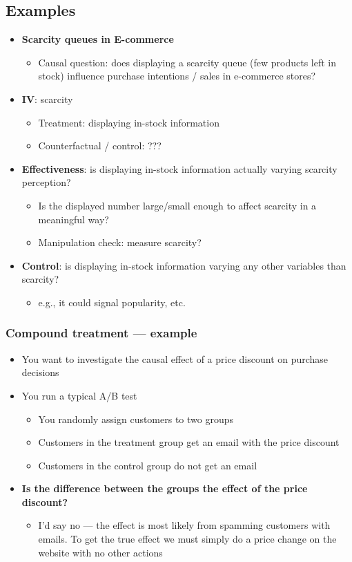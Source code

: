 \documentclass[10pt]{article}
\begin{document}
\subsection{Examples}
\begin{itemize}
    \item \textbf{Scarcity queues in E-commerce}
    \begin{itemize}
        \item Causal question: does displaying a scarcity queue (few products left in stock) influence purchase intentions / sales in e-commerce stores?
    \end{itemize}
    \item \textbf{IV}: scarcity
    \begin{itemize}
        \item Treatment: displaying in-stock information 
        \item Counterfactual / control: ???
    \end{itemize}
    \item \textbf{Effectiveness}: is displaying in-stock information actually varying scarcity perception?
    \begin{itemize}
        \item Is the displayed number large/small enough to affect scarcity in a meaningful way?
        \item Manipulation check: measure scarcity?
    \end{itemize}
    \item \textbf{Control}: is displaying in-stock information varying any other variables than scarcity?
    \begin{itemize}
        \item e.g., it could signal popularity, etc. 
    \end{itemize}
\end{itemize}
\subsubsection{Compound treatment --- example}
\begin{itemize}
    \item You want to investigate the causal effect of a price discount on purchase decisions
    \item You run a typical A/B test
    \begin{itemize}
        \item You randomly assign customers to two groups 
        \item Customers in the treatment group get an email with the price discount 
        \item Customers in the control group do not get an email 
    \end{itemize}
    \item \textbf{Is the difference between the groups the effect of the price discount?}
    \begin{itemize}
        \item I'd say no --- the effect is most likely from spamming customers with emails. To get the true effect we must simply do a price change on the website with no other actions 
    \end{itemize}
\end{itemize}
\newpage 
\end{document}
